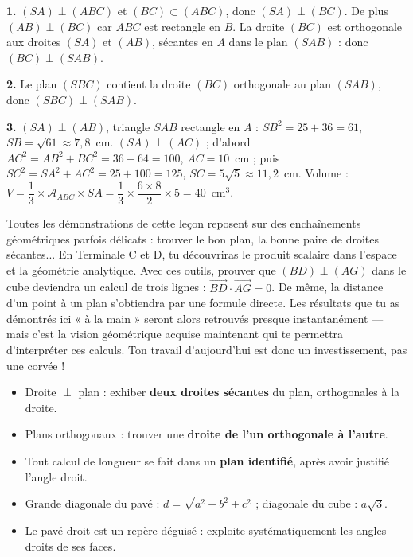 \documentclass[11pt]{article}
\newcommand{\cle}[1]{{\popxbold\color{popdark}#1}}
\newcounter{popsec}
\newcounter{popsub}
\newcommand{\courssub}[1]{%
  \stepcounter{popsub}%
  \par\vspace{9pt}\noindent{\popxbold\fontsize{11.5}{13}\selectfont\color{popink}{\color{poporange}\thepopsec.\thepopsub}\hspace{6pt}#1}\par\nopagebreak\vspace{4pt}
}
\begin{document}
\begin{corrige}
\textbf{1.} $(SA) \perp (ABC)$ et $(BC) \subset (ABC)$, donc $(SA) \perp (BC)$. De plus $(AB) \perp (BC)$ car $ABC$ est rectangle en $B$. La droite $(BC)$ est orthogonale aux droites $(SA)$ et $(AB)$, sécantes en $A$ dans le plan $(SAB)$ : donc $(BC) \perp (SAB)$.

\textbf{2.} Le plan $(SBC)$ contient la droite $(BC)$ orthogonale au plan $(SAB)$, donc $(SBC) \perp (SAB)$.

\textbf{3.} $(SA) \perp (AB)$, triangle $SAB$ rectangle en $A$ : $SB^2 = 25 + 36 = 61$, $SB = \sqrt{61} \approx 7{,}8$~cm. $(SA) \perp (AC)$ ; d'abord $AC^2 = AB^2 + BC^2 = 36 + 64 = 100$, $AC = 10$~cm ; puis $SC^2 = SA^2 + AC^2 = 25 + 100 = 125$, $SC = 5\sqrt{5} \approx 11{,}2$~cm. Volume : $V = \dfrac{1}{3} \times \mathcal{A}_{ABC} \times SA = \dfrac{1}{3} \times \dfrac{6 \times 8}{2} \times 5 = 40$~cm$^3$.
\end{corrige}

\courssub{Ouverture vers la Terminale}

\begin{savaistu}
Toutes les démonstrations de cette leçon reposent sur des enchaînements géométriques parfois délicats : trouver le bon plan, la bonne paire de droites sécantes... En Terminale C et D, tu découvriras le \cle{produit scalaire} dans l'espace et la \cle{géométrie analytique}. Avec ces outils, prouver que $(BD) \perp (AG)$ dans le cube deviendra un calcul de trois lignes : $\overrightarrow{BD} \cdot \overrightarrow{AG} = 0$. De même, la distance d'un point à un plan s'obtiendra par une formule directe. Les résultats que tu as démontrés ici « à la main » seront alors retrouvés presque instantanément — mais c'est la vision géométrique acquise maintenant qui te permettra d'interpréter ces calculs. Ton travail d'aujourd'hui est donc un investissement, pas une corvée !
\end{savaistu}

\begin{aretenir}
\begin{itemize}
\item Droite $\perp$ plan : exhiber \textbf{deux droites sécantes} du plan, orthogonales à la droite.
\item Plans orthogonaux : trouver une \textbf{droite de l'un orthogonale à l'autre}.
\item Tout calcul de longueur se fait dans un \textbf{plan identifié}, après avoir justifié l'angle droit.
\item Grande diagonale du pavé : $d = \sqrt{a^2+b^2+c^2}$ ; diagonale du cube : $a\sqrt{3}$.
\item Le pavé droit est un repère déguisé : exploite systématiquement les angles droits de ses faces.
\end{itemize}
\end{aretenir}
\end{document}
